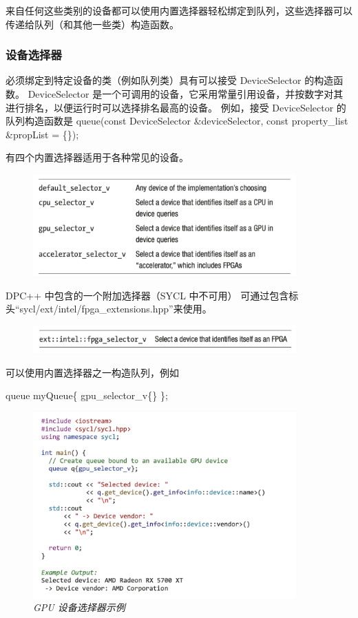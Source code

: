 来自任何这些类别的设备都可以使用内置选择器轻松绑定到队列，这些选择器可以传递给队列（和其他一些类）构造函数。

\subsubsection{设备选择器}
必须绑定到特定设备的类（例如队列类）具有可以接受 DeviceSelector 的构造函数。 
DeviceSelector 是一个可调用的设备，它采用常量引用设备，并按数字对其进行排名，以便运行时可以选择排名最高的设备。 
例如，接受 DeviceSelector 的队列构造函数是
queue(const DeviceSelector \&deviceSelector, const property\_list \&propList = \{\});

有四个内置选择器适用于各种常见的设备。

\begin{figure}[!htbp]
	\centering
	\includegraphics[width=0.9\textwidth]{figs/F2-a1.png}
\end{figure}

DPC++ 中包含的一个附加选择器（SYCL 中不可用）
可通过包含标头“sycl/ext/intel/fpga\_extensions.hpp”来使用。

\begin{figure}[!htbp]
	\centering
	\includegraphics[width=0.9\textwidth]{figs/F2-a2.png}
\end{figure}

可以使用内置选择器之一构造队列，例如

queue myQueue\{ gpu\_selector\_v\{\} \}; 

\begin{figure}[H]
	\centering
	\includegraphics[width=0.9\textwidth]{figs/F2.10.png}
	\caption{\textit{GPU 设备选择器示例}}
\end{figure}

